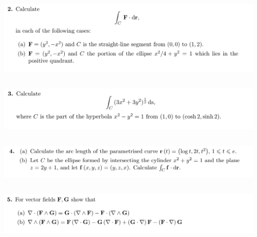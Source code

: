 \documentclass[12pt]{article}
\begin{document}
\subsection{}
\begin{mdframed}
\includegraphics[width=400pt]{img/oxford-prelims-M5-multivariable-calc-5-2.png}
\end{mdframed}

\subsection{}
\begin{mdframed}
\includegraphics[width=400pt]{img/oxford-prelims-M5-multivariable-calc-5-3.png}
\end{mdframed}

\subsection{}
\begin{mdframed}
\includegraphics[width=400pt]{img/oxford-prelims-M5-multivariable-calc-5-4.png}
\end{mdframed}

\subsection{}
\begin{mdframed}
\includegraphics[width=400pt]{img/oxford-prelims-M5-multivariable-calc-5-5.png}
\end{mdframed}
\end{document}
